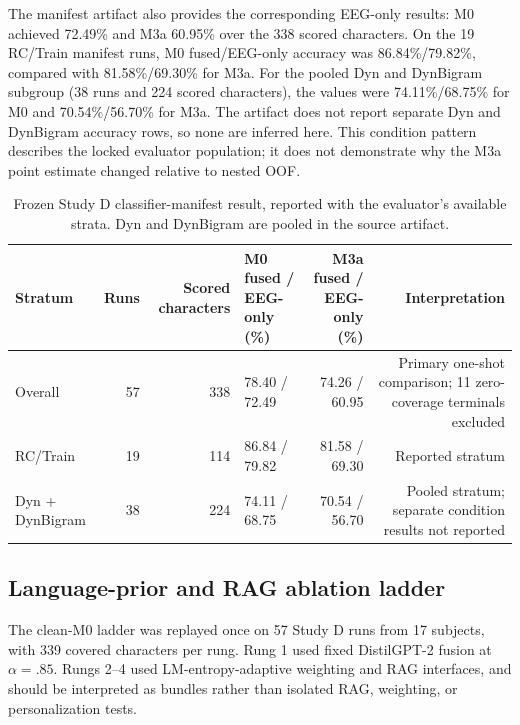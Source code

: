 \documentclass[final,5p,times,twocolumn,authoryear]{elsarticle}
\begin{document}
The manifest artifact also provides the corresponding EEG-only results: M0 achieved 72.49\% and M3a 60.95\% over the 338 scored characters. On the 19 RC/Train manifest runs, M0 fused/EEG-only accuracy was 86.84\%/79.82\%, compared with 81.58\%/69.30\% for M3a. For the pooled Dyn and DynBigram subgroup (38 runs and 224 scored characters), the values were 74.11\%/68.75\% for M0 and 70.54\%/56.70\% for M3a. The artifact does not report separate Dyn and DynBigram accuracy rows, so none are inferred here. This condition pattern describes the locked evaluator population; it does not demonstrate why the M3a point estimate changed relative to nested OOF.

\begin{table}[t]
\centering\small
\caption{Frozen Study D classifier-manifest result, reported with the evaluator's available strata. Dyn and DynBigram are pooled in the source artifact.}\label{tab:manifest-strata}
\begin{tabular}{lrrlrr}
\toprule
Stratum & Runs & Scored characters & M0 fused / EEG-only (\%) & M3a fused / EEG-only (\%) & Interpretation\\
\midrule
Overall & 57 & 338 & 78.40 / 72.49 & 74.26 / 60.95 & Primary one-shot comparison; 11 zero-coverage terminals excluded\\
RC/Train & 19 & 114 & 86.84 / 79.82 & 81.58 / 69.30 & Reported stratum\\
Dyn + DynBigram & 38 & 224 & 74.11 / 68.75 & 70.54 / 56.70 & Pooled stratum; separate condition results not reported\\
\bottomrule
\end{tabular}
\end{table}

\subsection{Language-prior and RAG ablation ladder}
The clean-M0 ladder was replayed once on 57 Study D runs from 17 subjects, with 339 covered characters per rung. Rung 1 used fixed DistilGPT-2 fusion at $\alpha=.85$. Rungs 2--4 used LM-entropy-adaptive weighting and RAG interfaces, and should be interpreted as bundles rather than isolated RAG, weighting, or personalization tests.
\end{document}
